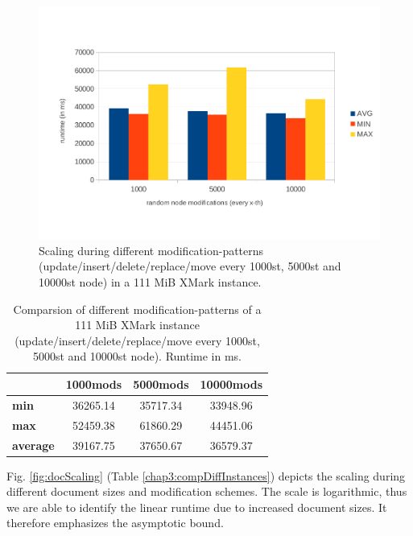 \begin{figure}[tb]
\centering
\includegraphics[width=\textwidth]{figures/100MB-scaling}
\caption{Scaling during different modification-patterns (update/insert/delete/replace/move every 1000st, 5000st and 10000st node) in a 111 MiB XMark instance.} 
\label{fig:100MBscaling}
\end{figure}

\begin{table}[tb]
\centering 
\begin{tabular}[r]{|l|c|c|c|} 
\hline
& \textbf{1000mods} & \textbf{5000mods} & \textbf{10000mods}\\
\hline
\hline
\textbf{min} & 36265.14 & 35717.34 & 33948.96\\
\hline
\textbf{max} & 52459.38 & 61860.29 & 44451.06\\
\hline
\textbf{average} & 39167.75 & 37650.67 & 36579.37\\
\hline
\end{tabular}
\label{chap3:comparsion}
\vspace{0.5em} 
\caption{Comparsion of different modification-patterns of a 111 MiB XMark instance (update/insert/delete/replace/move every 1000st, 5000st and 10000st node). Runtime in ms.}
\end{table}

Fig. \ref{fig:docScaling} (Table \ref{chap3:compDiffInstances}) depicts the scaling during different document sizes and modification schemes. The scale is logarithmic, thus we are able to identify the linear runtime due to increased document sizes. It therefore emphasizes the asymptotic bound.

